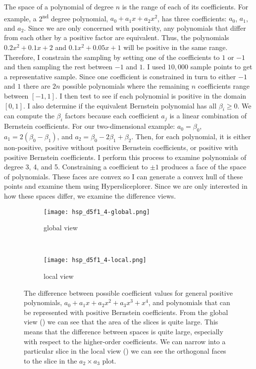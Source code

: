 The space of a polynomial of degree \(n\) is the range of each of its
coefficients. For example, a 2\textsuperscript{nd} degree polynomial, \(a_0 +
a_1 x + a_2 x^2\), has three coefficients: \(a_0\), \(a_1\), and \(a_2\).
Since we are only concerned with positivity, any polynomials that differ from
each other by a positive factor are equivalent. Thus, the polynomials $0.2x^2 +
0.1x + 2$ and $0.1x^2 + 0.05x + 1$ will be positive in the same range.
Therefore, I constrain the sampling by setting one of the coefficients to $1$
or $-1$ and then sampling the rest between $-1$ and $1$.  I used $10,000$
sample points to get a representative sample.  Since one coefficient is
constrained in turn to either \(-1\) and \(1\) there are \(2n\) possible
polynomials where the remaining \(n\) coefficients range between \([-1,1]\). I
then test to see if each polynomial is positive in the domain \([0,1]\). I also
determine if the equivalent Bernstein polynomial has all \(\beta_i \ge 0\). We
can compute the \(\beta_i\) factors because each coefficient \(a_j\) is a
linear combination of Bernstein coefficients. For our two-dimensional example:
\(a_0 = \beta_0\), \(a_1 = 2(\beta_0-\beta_1)\), and \(a_2=\beta_0 - 2\beta_1 +
\beta_2\). Then, for each polynomial, it is either non-positive, positive
without positive Bernstein coefficients, or positive with positive Bernstein
coefficients. I perform this process to examine polynomials of degree 3, 4, and
5. Constraining a coefficient to $\pm 1$ produces a face of the space of
polynomials. These faces are convex so I can generate a convex hull of these
points and examine them using Hypersliceplorer. Since we are only interested in
how these spaces differ, we examine the difference views.

\begin{figure}
  \centering
  \begin{subfigure}[b]{0.45\linewidth}
    \texttt{[image: hsp\_d5f1\_4-global.png]}
    \caption{global view}
    \label{fig:spacediff:global}
  \end{subfigure}
  ~
  \begin{subfigure}[b]{0.45\linewidth}
    \texttt{[image: hsp\_d5f1\_4-local.png]}
    \caption{local view}
    \label{fig:spacediff:local}
  \end{subfigure}
  \caption{
    The difference between possible coefficient values for general positive 
    polynomials, $a_0 + a_1 x + a_2 x^2 + a_3 x^3 + x^4$, and polynomials
    that can be represented with positive Bernstein coefficients. From the 
    global view () we can see that the 
    area of the slices is quite large. This means that the 
    difference between spaces is quite large, especially with respect to the
    higher-order coefficients. We can narrow into a particular slice in
    the local view () we can see 
    the orthogonal faces to the slice in the $a_2 \times a_3$ plot.
  }
  \label{fig:spacediff}
\end{figure}

